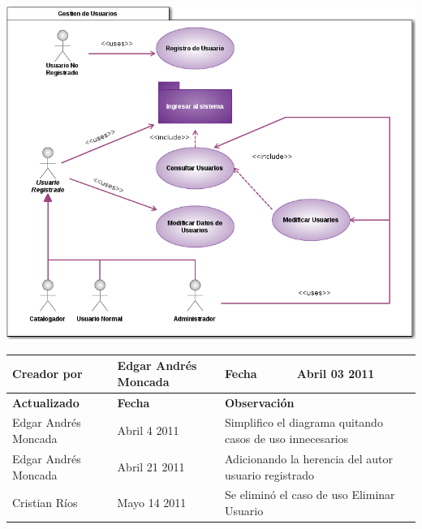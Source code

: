 
%
\begin{minipage}[c]{1\linewidth}
	\centering
    \includegraphics[scale=.6]{casosUso/CUGestionUsuarios}\\[0.5cm]
               
    \begin{tabular}{|p{}|p{}|p{}|p{}|}
    \hline
    {\bf Creador por} & {Edgar Andrés Moncada} & {\bf Fecha} & {Abril 03 2011}\\
    \hline
    \hline
    {\bf Actualizado}&{\bf Fecha}&\multicolumn{2}{p{0.45\textwidth}|}{\bf Observación}\\
    \hline
    {Edgar Andrés Moncada}&{Abril 4 2011}&\multicolumn{2}{p{0.45\textwidth}|}{Simplifico el
    diagrama quitando casos de uso innecesarios}\\
    \hline
    {Edgar Andrés Moncada}&{Abril 21 2011}&\multicolumn{2}{p{0.45\textwidth}|}{Adicionando la
    herencia del autor usuario registrado}\\
    \hline	
    {Cristian Ríos}&{Mayo 14 2011}&\multicolumn{2}{p{0.45\textwidth}|}{Se eliminó el caso de uso Eliminar Usuario}\\
    \hline	
    \end{tabular}
\end{minipage}     

